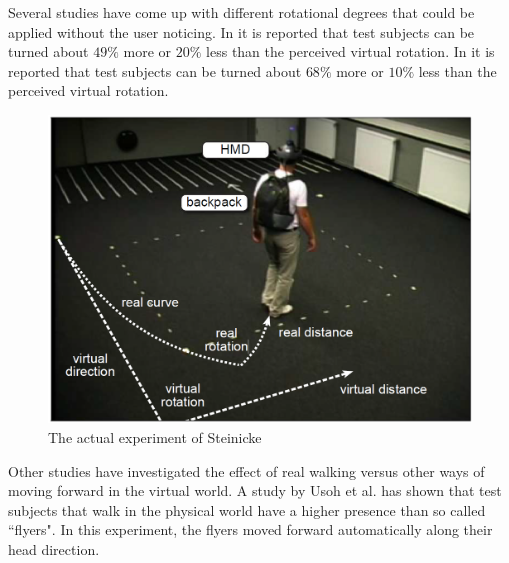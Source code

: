 Several studies \cite{steinicke2}\cite{steinicke1} have come up with different rotational degrees that could be applied without the user noticing.
In \cite{steinicke2} it is reported that test subjects can be turned about $49\%$ more or $20\%$ less than the perceived virtual rotation. 
In \cite{steinicke1} it is reported that test subjects can be turned about $68\%$ more or $10\%$ less than the perceived virtual rotation. 
\begin{figure}[htb]
	\centering
	\includegraphics[width=\linewidth]{sections/finalreport/images/steinicke-1.png}	
	\caption{The actual experiment of Steinicke}
\end{figure}
Other studies have investigated the effect of real walking versus other ways of moving forward in the virtual world.
A study by Usoh et al. \cite{usoh} has shown that test subjects that walk in the physical world have a higher presence than so called ``flyers".
In this experiment, the flyers moved forward automatically along their head direction.


